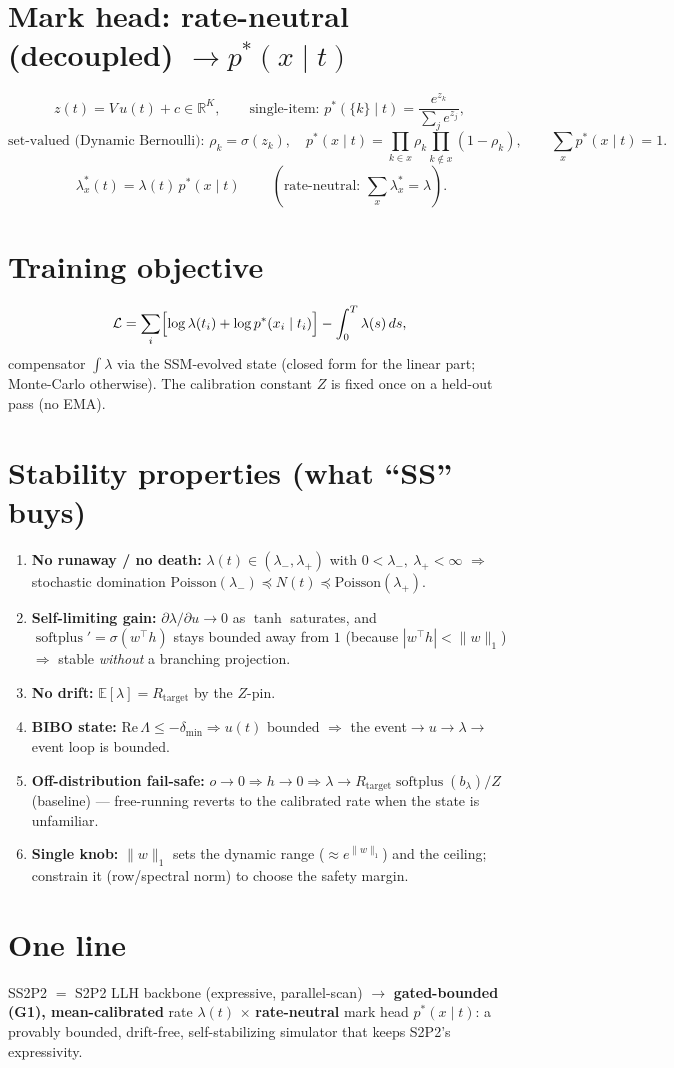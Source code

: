 \documentclass[11pt]{article}
\newcommand{\R}{\mathbb{R}}
\newcommand{\E}{\mathbb{E}}
\newcommand{\softplus}{\operatorname{softplus}}
\newcommand{\Lam}{\Lambda}
\begin{document}
\section{Mark head: rate-neutral (decoupled) $\to p^*(x\mid t)$}
\[
z(t)=V\,u(t)+c\in\R^{K},\qquad
\text{single-item: } p^*(\{k\}\mid t)=\frac{e^{z_k}}{\sum_j e^{z_j}},
\]
\[
\text{set-valued (Dynamic Bernoulli): } \rho_k=\sigma(z_k),\quad
p^*(x\mid t)=\!\prod_{k\in x}\rho_k\!\prod_{k\notin x}(1-\rho_k),\qquad \sum_x p^*(x\mid t)=1 .
\]
\[
\boxed{\ \lambda^*_x(t)=\lambda(t)\,p^*(x\mid t)\ }\qquad(\text{rate-neutral: }\textstyle\sum_x\lambda^*_x=\lambda).
\]

\section{Training objective}
\[
\mathcal L=\sum_{i}\Bigl[\log\lambda(t_i)+\log p^*(x_i\mid t_i)\Bigr]-\int_0^T\lambda(s)\,ds ,
\]
compensator $\int\lambda$ via the SSM-evolved state (closed form for the linear part; Monte-Carlo
otherwise). The calibration constant $Z$ is fixed once on a held-out pass (no EMA).

\section{Stability properties (what ``SS'' buys)}
\begin{enumerate}[leftmargin=1.5em,itemsep=2pt]
\item \textbf{No runaway / no death:} $\lambda(t)\in(\lambda_-,\lambda_+)$ with $0<\lambda_-,\ \lambda_+<\infty$
$\Rightarrow$ stochastic domination $\mathrm{Poisson}(\lambda_-)\preceq N(t)\preceq\mathrm{Poisson}(\lambda_+)$.
\item \textbf{Self-limiting gain:} $\partial\lambda/\partial u\to0$ as $\tanh$ saturates, and
$\softplus'=\sigma(w^\top h)$ stays bounded away from $1$ (because $|w^\top h|<\|w\|_1$)
$\Rightarrow$ stable \emph{without} a branching projection.
\item \textbf{No drift:} $\E[\lambda]=R_{\mathrm{target}}$ by the $Z$-pin.
\item \textbf{BIBO state:} $\mathrm{Re}\,\Lam\le-\delta_{\min}\Rightarrow u(t)$ bounded $\Rightarrow$ the
event$\to u\to\lambda\to$event loop is bounded.
\item \textbf{Off-distribution fail-safe:} $o\to0\Rightarrow h\to0\Rightarrow
\lambda\to R_{\mathrm{target}}\softplus(b_\lambda)/Z$ (baseline) — free-running reverts to the calibrated
rate when the state is unfamiliar.
\item \textbf{Single knob:} $\|w\|_1$ sets the dynamic range ($\approx e^{\|w\|_1}$) and the ceiling;
constrain it (row/spectral norm) to choose the safety margin.
\end{enumerate}

\section*{One line}
\noindent SS2P2 $=$ S2P2 LLH backbone (expressive, parallel-scan) $\to$ \textbf{gated-bounded (G1),
mean-calibrated} rate $\lambda(t)$ $\times$ \textbf{rate-neutral} mark head $p^*(x\mid t)$: a provably
bounded, drift-free, self-stabilizing simulator that keeps S2P2's expressivity.
\end{document}

